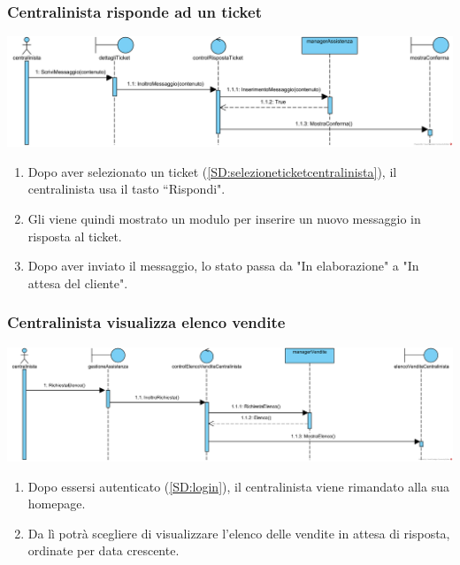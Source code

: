 \documentclass[12pt,a4paper]{article}
\begin{document}
\newpage

\subsubsection{Centralinista risponde ad un ticket}
\label{SD:rispostaticketcentralinista}

\begin{center}
\includegraphics[width=\textwidth]{SequenceDiagram/CentralinistaTicketRisponde}
\end{center}

\begin{enumerate}
\item Dopo aver selezionato un ticket (\ref{SD:selezioneticketcentralinista}), il centralinista usa il tasto ``Rispondi".
\item Gli viene quindi mostrato un modulo per inserire un nuovo messaggio in risposta al ticket.
\item Dopo aver inviato il messaggio, lo stato passa da "In elaborazione" a "In attesa del cliente".
\end{enumerate}

\subsubsection{Centralinista visualizza elenco vendite}
\label{SD:elencovenditecentralinista}

\begin{center}
\includegraphics[width=\textwidth]{SequenceDiagram/CentralinistaVenditeElenco}
\end{center}

\begin{enumerate}
\item Dopo essersi autenticato (\ref{SD:login}), il centralinista viene rimandato alla sua homepage. 
\item Da lì potrà scegliere di visualizzare l'elenco delle vendite in attesa di risposta, ordinate per data crescente.
\end{enumerate}
\end{document}
